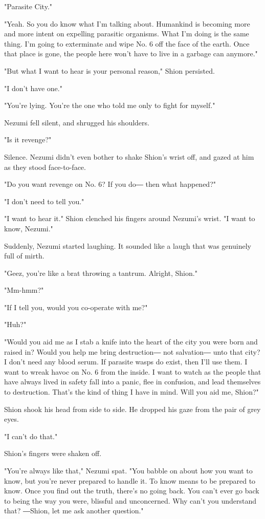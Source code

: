 "Parasite City."

"Yeah. So you do know what I'm talking about. Humankind is becoming more
and more intent on expelling parasitic organisms. What I'm doing is the
same thing. I'm going to exterminate and wipe No. 6 off the face of the
earth. Once that place is gone, the people here won't have to live in a
garbage can anymore."

"But what I want to hear is your personal reason," Shion persisted.

"I don't have one."

"You're lying. You're the one who told me only to fight for myself."

Nezumi fell silent, and shrugged his shoulders.

"Is it revenge?"

Silence. Nezumi didn't even bother to shake Shion's wrist off, and gazed
at him as they stood face-to-face.

"Do you want revenge on No. 6? If you do― then what happened?"

"I don't need to tell you."

"I want to hear it." Shion clenched his fingers around Nezumi's wrist.
"I want to know, Nezumi."

Suddenly, Nezumi started laughing. It sounded like a laugh that was
genuinely full of mirth.

"Geez, you're like a brat throwing a tantrum. Alright, Shion."

"Mm-hmm?"

"If I tell you, would you co-operate with me?"

"Huh?"

"Would you aid me as I stab a knife into the heart of the city you were
born and raised in? Would you help me bring destruction― not salvation―
unto that city? I don't need any blood serum. If parasite wasps do
exist, then I'll use them. I want to wreak havoc on No. 6 from the
inside. I want to watch as the people that have always lived in safety
fall into a panic, flee in confusion, and lead themselves to
destruction. That's the kind of thing I have in mind. Will you aid me,
Shion?"

Shion shook his head from side to side. He dropped his gaze from the
pair of grey eyes.

"I can't do that."

Shion's fingers were shaken off.

"You're always like that," Nezumi spat. "You babble on about how you
want to know, but you're never prepared to handle it. To know means to
be prepared to know. Once you find out the truth, there's no going back.
You can't ever go back to being the way you were, blissful and
unconcerned. Why can't you understand that? ―Shion, let me ask another
question."

